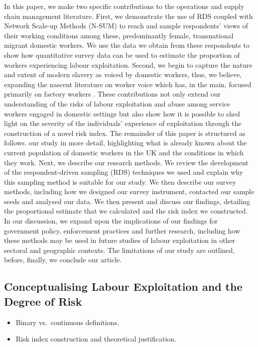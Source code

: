 \documentclass[
  12pt,
  letterpaper,
  DIV=11,
  numbers=noendperiod]{scrartcl}
\theoremstyle{plain}
\theoremstyle{definition}
\begin{document}
In this paper, we make two specific contributions to the operations and
supply chain management literature. First, we demonstrate the use of RDS
coupled with Network Scale-up Methods (N-SUM) to reach and sample
respondents' views of their working conditions among these,
predominantly female, transnational migrant domestic workers. We use the
data we obtain from these respondents to show how quantitative survey data can be
used to estimate the proportion of workers experiencing labour
exploitation. Second, we begin to capture the nature and extent of
modern slavery as voiced by domestic workers, thus, we
believe, expanding the nascent literature on worker voice which has, in
the main, focused primarily on factory workers
\autocite{stephens_theorising_2024}. These contributions
not only extend our understanding of the risks of labour exploitation
and abuse among service workers engaged in domestic settings but also
show how it is possible to shed light on the severity of the
individuals' experience of exploitation through the construction of a
novel risk index. The remainder of this paper is structured as follows.
our study in more detail, highlighting what is already known about the
current population of domestic workers in the UK and the conditions in
which they work. Next, we describe our research methods. We review the
development of the respondent-driven sampling (RDS) techniques we used
and explain why this sampling method is suitable for our study. We then
describe our survey methods, including how we designed our survey
instrument, contacted our sample seeds and analysed our data. We then
present and discuss our findings, detailing the proportional estimate
that we calculated and the risk index we constructed. In our discussion,
we expand upon the implications of our findings for government policy,
enforcement practices and further research, including how these methods
may be used in future studies of labour exploitation in other sectoral
and geographic contexts. The limitations of our study are outlined,
before, finally, we conclude our article.

\subsection{Conceptualising Labour Exploitation and the Degree of
Risk}\label{conceptualising-labour-exploitation-and-the-degree-of-risk}

\begin{itemize}
\item
  Binary vs.~continuous definitions.
\item
  Risk index construction and theoretical justification.
\end{itemize}
\end{document}
